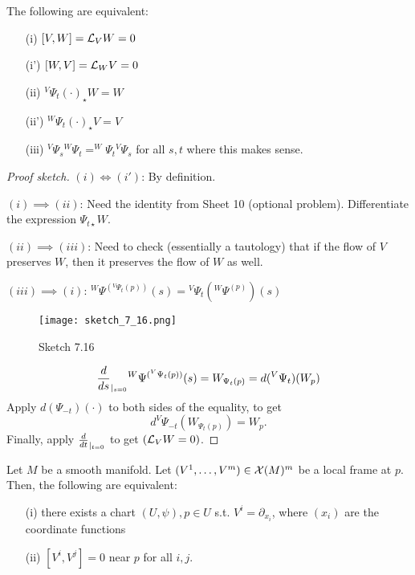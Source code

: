 \begin{theorem}\label{thm:7.15}
    The following are equivalent:
    \begin{enumerate}
        \item[(i)] \([V,W]=\mathcal{L}_VW=0\) 
        \item[(i')] \([W,V]=\mathcal{L}_WV=0\)
        \item[(ii)] \(^V\Psi_t(\cdot)_\star W=W\)
        \item[(ii')] \(^W\Psi_t(\cdot)_\star V=V\)
        \item[(iii)] \(^V\Psi_s {}^W\Psi_t=^W\Psi_t {}^V\Psi_s\) for all \(s,t\) where this makes sense.   
    \end{enumerate}
\end{theorem}

\begin{proof}[Proof sketch]
    \((i)\iff (i')\): By definition.

    \((i)\implies (ii)\): Need the identity from Sheet 10 (optional problem). Differentiate the expression \(\Psi_{t\star}W\).

    \((ii)\implies (iii)\): Need to check (essentially a tautology) that if the flow of \(V\) preserves \(W\), then it preserves the flow of \(W\) as well.

    \((iii)\implies (i)\): \(^W\Psi {}^{( {}^V\Psi_t(p))}(s)= {}^V\Psi_t({}^W\Psi^{(p)})(s)\)
    \begin{figure}[H]\label{fig:7.16}
        \centering
        \texttt{[image: sketch\_7\_16.png]}
        \caption{Sketch 7.16}
    \end{figure}
    \[\frac{d}{ds}_{|_{s=0}} {}^W\Psi {}^{( {}^V\Psi_t(p))}(s)=W_{\Psi_t(p)}=d( {}^V\Psi_t)(W_p)\]
    Apply \(d(\Psi_{-t})(\cdot)\) to both sides of the equality, to get 
    \[d ^V\Psi_{-t}\left(W_{\Psi_t(p)}\right)=W_p.\]
    Finally, apply \(\frac{d}{dt}_{|_{t=0}}\) to get \((\mathcal{L}_VW=0)\).
\end{proof}


\begin{theorem}\label{thm:7.16}
    Let \(M\) be a smooth manifold. Let \((V^1,\dots,V^m)\in \mathcal{X}(M)^m\) be a local frame at \(p\).
    Then, the following are equivalent:
    \begin{enumerate}
        \item[(i)] there exists a chart \((U,\psi),p\in U\) s.t. \(V^i=\partial_{x_i}\), where \((x_i)\) are the coordinate functions
        \item[(ii)] \([V^i,V^j]=0\) near \(p\) for all \(i,j\).  
    \end{enumerate}
\end{theorem}

